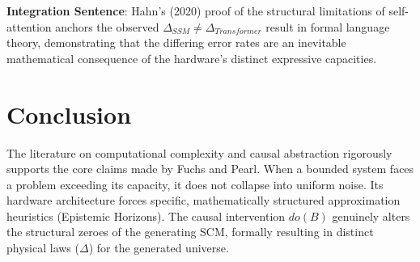 \documentclass{article}
\begin{document}
\textbf{Integration Sentence}: Hahn's (2020) proof of the structural limitations of self-attention anchors the observed $\Delta_{SSM} \neq \Delta_{Transformer}$ result in formal language theory, demonstrating that the differing error rates are an inevitable mathematical consequence of the hardware's distinct expressive capacities.

\section{Conclusion}
The literature on computational complexity and causal abstraction rigorously supports the core claims made by Fuchs and Pearl. When a bounded system faces a problem exceeding its capacity, it does not collapse into uniform noise. Its hardware architecture forces specific, mathematically structured approximation heuristics (Epistemic Horizons). The causal intervention $do(B)$ genuinely alters the structural zeroes of the generating SCM, formally resulting in distinct physical laws ($\Delta$) for the generated universe.
\end{document}
